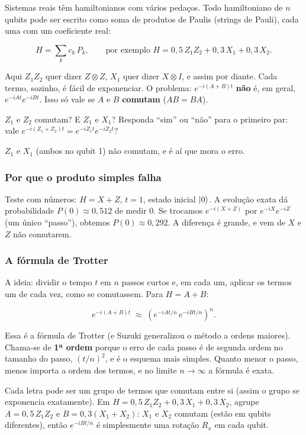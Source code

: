 Sistemas reais têm hamiltonianos com vários pedaços. Todo hamiltoniano de \(n\) qubits pode ser escrito como soma de produtos de Paulis (strings de Pauli), cada uma com um coeficiente real:

\[
H = \sum_k c_k\, P_k, \qquad \text{por exemplo } H = 0{,}5\,Z_1 Z_2 + 0{,}3\,X_1 + 0{,}3\,X_2.
\]

Aqui \(Z_1Z_2\) quer dizer \(Z\otimes Z\), \(X_1\) quer dizer \(X\otimes I\), e assim por diante. Cada termo, sozinho, é fácil de exponenciar. O problema: \(e^{-i(A+B)t}\) \textbf{não} é, em geral, \(e^{-iAt}e^{-iBt}\). Isso só vale se \(A\) e \(B\) \textbf{comutam} (\(AB = BA\)).

\(Z_1\) e \(Z_2\) comutam? E \(Z_1\) e \(X_1\)? Responda ``sim'' ou ``não'' para o primeiro par: vale \(e^{-i(Z_1+Z_2)t} = e^{-iZ_1t}e^{-iZ_2t}\)?

\(Z_1\) e \(X_1\) (ambos no qubit 1) não comutam, e é aí que mora o erro.

\subsubsection{Por que o produto simples falha}\label{por-que-o-produto-simples-falha}

Teste com números: \(H = X + Z\), \(t = 1\), estado inicial \(\left|{0}\right>\). A evolução exata dá probabilidade \(P(0) \approx 0{,}512\) de medir 0. Se trocamos \(e^{-i(X+Z)}\) por \(e^{-iX}e^{-iZ}\) (um único ``passo''), obtemos \(P(0) \approx 0{,}292\). A diferença é grande, e vem de \(X\) e \(Z\) não comutarem.

\subsubsection{A fórmula de Trotter}\label{a-fuxf3rmula-de-trotter}

A ideia: dividir o tempo \(t\) em \(n\) passos curtos e, em cada um, aplicar os termos um de cada vez, como se comutassem. Para \(H = A + B\):

\[
e^{-i(A+B)t} \;\approx\; \left( e^{-iAt/n}\, e^{-iBt/n} \right)^{n}.
\]

Essa é a fórmula de Trotter (e Suzuki generalizou o método a ordens maiores). Chama-se de \textbf{1ª ordem} porque o erro de cada passo é de segunda ordem no tamanho do passo, \((t/n)^2\), e é o esquema mais simples. Quanto menor o passo, menos importa a ordem dos termos, e no limite \(n\to\infty\) a fórmula é exata.

Cada letra pode ser um grupo de termos que comutam entre si (assim o grupo se exponencia exatamente). Em \(H = 0{,}5\,Z_1Z_2 + 0{,}3\,X_1 + 0{,}3\,X_2\), agrupe \(A = 0{,}5\,Z_1Z_2\) e \(B = 0{,}3(X_1 + X_2)\): \(X_1\) e \(X_2\) comutam (estão em qubits diferentes), então \(e^{-iBt/n}\) é simplesmente uma rotação \(R_x\) em cada qubit.

